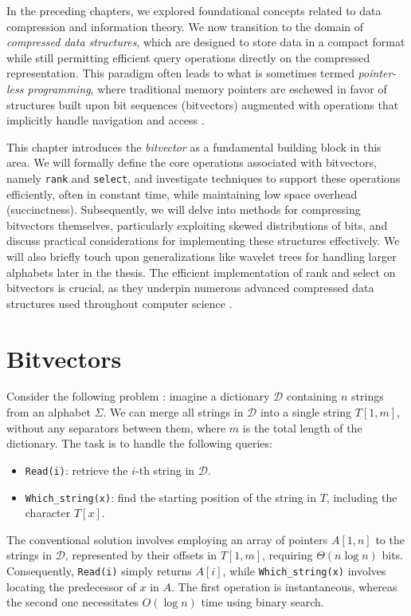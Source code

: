 In the preceding chapters, we explored foundational concepts related to data compression and information theory. We now transition to the domain of \emph{compressed data structures}, which are designed to store data in a compact format while still permitting efficient query operations directly on the compressed representation. This paradigm often leads to what is sometimes termed \emph{pointer-less programming}, where traditional memory pointers are eschewed in favor of structures built upon bit sequences (bitvectors) augmented with operations that implicitly handle navigation and access \cite{ferragina2023pearls}.

This chapter introduces the \emph{bitvector} as a fundamental building block in this area. We will formally define the core operations associated with bitvectors, namely \texttt{rank} and \texttt{select}, and investigate techniques to support these operations efficiently, often in constant time, while maintaining low space overhead (succinctness). Subsequently, we will delve into methods for compressing bitvectors themselves, particularly exploiting skewed distributions of bits, and discuss practical considerations for implementing these structures effectively. We will also briefly touch upon generalizations like wavelet trees for handling larger alphabets later in the thesis. The efficient implementation of rank and select on bitvectors is crucial, as they underpin numerous advanced compressed data structures used throughout computer science \cite{navarro2016compact}.


\section{Bitvectors} \label{sec:bitvectors}
Consider the following problem \cite{ferragina2023pearls}: imagine a dictionary $\mathcal{D}$ containing $n$ strings from an alphabet $\Sigma$. We can merge all strings in $\mathcal{D}$ into a single string $T[1,m]$, without any separators between them, where $m$ is the total length of the dictionary. The task is to handle the following queries:
\begin{itemize}
    \item \texttt{Read(i)}: retrieve the $i$-th string in $\mathcal{D}$.
    \item \texttt{Which\_string(x)}: find the starting position of the string in $T$, including the character $T[x]$.
\end{itemize}
The conventional solution involves employing an array of pointers $A[1, n]$ to the strings in $\mathcal{D}$, represented by their offsets in $T[1, m]$, requiring $\Theta(n \log n)$ bits. Consequently, \texttt{Read(i)} simply returns $A[i]$, while \texttt{Which\_string(x)} involves locating the predecessor of $x$ in $A$. The first operation is instantaneous, whereas the second one necessitates $O(\log n)$ time using binary search.

